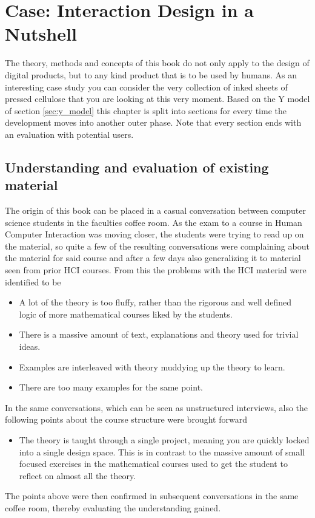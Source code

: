 \chapter{Case: Interaction Design in a Nutshell} \label{chap:case_meta}
The theory, methods and concepts of this book do not only apply to the design of digital products, but to any kind product that is to be used by humans. As an interesting case study you can consider the very collection of inked sheets of pressed cellulose that you are looking at this very moment. Based on the Y model of section \ref{sec:y_model} this chapter is split into sections for every time the development moves into another outer phase. Note that every section ends with an evaluation with potential users.

\section*{Understanding and evaluation of existing material}
The origin of this book can be placed in a casual conversation between computer science students in the faculties coffee room. As the exam to a course in Human Computer Interaction was moving closer, the students were trying to read up on the material, so quite a few of the resulting conversations were complaining about the material for said course and after a few days also generalizing it to material seen from prior HCI courses. From this the problems with the HCI material were identified to be
\begin{itemize}
  \item A lot of the theory is too fluffy, rather than the rigorous and well defined logic of more mathematical courses liked by the students.
  \item There is a massive amount of text, explanations and theory used for trivial ideas.
  \item Examples are interleaved with theory muddying up the theory to learn.
  \item There are too many examples for the same point. 
\end{itemize}
In the same conversations, which can be seen as unstructured interviews, also the following points about the course structure were brought forward
\begin{itemize}
  \item The theory is taught through a single project, meaning you are quickly locked into a single design space. This is in contrast to the massive amount of small focused exercises in the mathematical courses used to get the student to reflect on almost all the theory.
\end{itemize}
The points above were then confirmed in subsequent conversations in the same coffee room, thereby evaluating the understanding gained.

